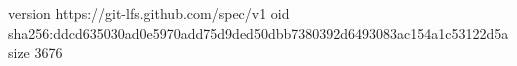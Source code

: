 version https://git-lfs.github.com/spec/v1
oid sha256:ddcd635030ad0e5970add75d9ded50dbb7380392d6493083ac154a1c53122d5a
size 3676

